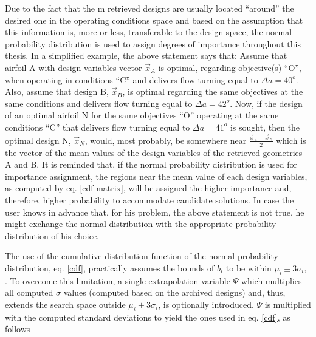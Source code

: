  

%

Due to the fact that the m retrieved designs are usually located ``around'' the desired one in the operating conditions space and based on the assumption that this information is, more or less, transferable to the design space, the  normal probability distribution is used to assign degrees of importance throughout this thesis. In a simplified example, the above statement says that: Assume that airfoil A with design variables vector $\vec{x}_A$ is optimal, regarding objective(s) ``O'', when operating in conditions ``C'' and delivers flow turning equal to $\Delta a\!=\!40^o$. Also, assume that design B, $\vec{x}_B$,  is optimal regarding the same objectives at the same conditions and delivers flow turning equal to $\Delta a \!=\!42^o$. Now, if the design of an optimal airfoil N for the same objectives ``O'' operating at the same conditions ``C'' that delivers flow turning equal to $\Delta a\!=\!41^o$ is sought, then the optimal design N, $\vec{x}_N$, would, most probably, be somewhere near $\frac{\vec{x}_A+\vec{x}_B}{2}$ which is the vector of the mean values of the design variables of the retrieved geometries A and B. It is reminded that, if the normal probability distribution is used for importance assignment, the regions near the mean value of each design variables, as computed by eq. \ref{cdf-matrix}, will be assigned the higher importance and, therefore, higher probability to accommodate candidate solutions. In case the user knows in advance that, for his problem, the above statement is not true, he might exchange the normal distribution with the appropriate probability distribution of his choice.           

The use of the cumulative distribution function of the normal probability distribution, eq. \ref{cdf}, practically assumes the bounds of $b_i$ to be within $\mu _i \pm 3\sigma _i$, \cite{Kiemele}. To overcome this limitation, a single extrapolation variable $\Psi$ which multiplies all computed $\sigma$ values (computed based on the archived designs) and, thus, extends the search space outside $\mu _i \pm 3\sigma _i$, is optionally introduced. $\Psi$ is multiplied with the computed standard deviations to yield the ones used in eq. \ref{cdf}, as follows


